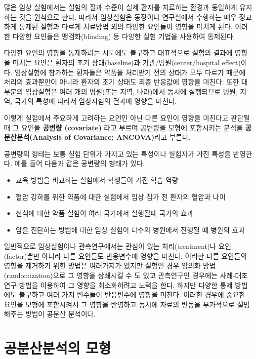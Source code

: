 \documentclass[
]{book}
\providecommand{\tightlist}{%
  \setlength{\itemsep}{0pt}\setlength{\parskip}{0pt}}
\begin{document}
많은 임상 실험에서는 실험의 질과 수준이 실제 환자를 치료하는 환경과 동일하게 유지하는 것을 원칙으로 한다. 따라서 임상실험은 동장이나 연구실에서 수행하는 매우 정교하게 통제된 실험과 다르게 치료방법 외의 다양한 요인들이 영향을 미치게 된다. 이러한 다양한 요인들은 맹검화(blinding) 등 다양한 실험 기법을 사용하여 통제된다.

다양한 요인의 영향을 통제하려는 시도에도 불구하고 대표적으로 실험의 결과에 영향을 미치는 요인은 환자의 초기 상태(baseline)과 기관/병원(center/hospital effect)이다. 임상실험에 참가하는 환자들은 약품을 처리받기 전의 상태가 모두 다르기 때문에 처리의 효과뿐만이 아니라 환자의 초기 상태도 최종 반응값에 영향을 미친다. 또한 대부분의 임상실험은 여러 개의 병원(또는 지역, 나라)에서 동시에 실행되므로 병원, 지역, 국가의 특성에 따라서 임상시험의 결과에 영향을 미친다.

이렇게 실험에서 주요하게 고려하는 요인인 아닌 다른 요인이 영향을 미친다고 판단될 때 그 요인을 \textbf{공변량 (covariate)} 라고 부르며 공변량을 모형에 포함시키는 분석을 \textbf{공분산분석(Analysis of Covariance; ANCOVA)}라고 부른다.

공변량의 형태는 보통 실험 단위가 가지고 있는 특성이나 실험자가 가진 특성을 반영한다. 예를 들어 다음과 같은 공변량의 형태가 있다.

\begin{itemize}
\tightlist
\item
  교육 방법을 비교하는 실험에서 학생들이 가진 학습 역량
\item
  혈압 강하를 위한 약품에 대한 실험에서 임상 참가 전 환자의 혈압과 나이
\item
  천식에 대한 약품 실험이 여러 국가에서 실행될때 국가의 효과
\item
  암을 진단하는 방법에 대한 임상 실험이 다수의 병원에서 진행될 때 병원의 효과
\end{itemize}

일반적으로 임상실험이나 관측연구에서는 관심이 있는 처리(treatment)나 요인(factor)뿐만 아니라 다른 요인들도 반응변수에 영향을 미친다. 이러한 다른 요인들의 영향을 제거하기 위한 방법은 여러가지가 있지만 실험인 경우 임의화 방법(randomization)으로 그 영향을 상쇄시킬 수 도 있고 관측연구인 경우에는 사례-대조연구 방법을 이용하여 그 영향을 최소화하려고 노력을 한다. 하지만 다양한 통제 방법에도 불구하고 여러 가지 변수들이 반응변수에 영향을 미친다. 이러한 경우에 중요한 요인을 모형에 포함시켜서 그 영향을 반영하고 동시에 자료의 변동을 부가적으로 설명해주는 방법이 공분산 분석이다.

\hypertarget{uxacf5uxbd84uxc0b0uxbd84uxc11duxc758-uxbaa8uxd615}{%
\section{공분산분석의 모형}\label{uxacf5uxbd84uxc0b0uxbd84uxc11duxc758-uxbaa8uxd615}}
\end{document}
